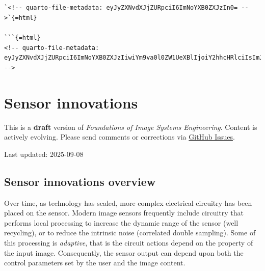 \documentclass[
  letterpaper,
]{book}
\begin{document}
\begin{verbatim}




`<!-- quarto-file-metadata: eyJyZXNvdXJjZURpciI6ImNoYXB0ZXJzIn0= -->`{=html}

```{=html}
<!-- quarto-file-metadata: eyJyZXNvdXJjZURpciI6ImNoYXB0ZXJzIiwiYm9va0l0ZW1UeXBlIjoiY2hhcHRlciIsImJvb2tJdGVtTnVtYmVyIjoyMCwiYm9va0l0ZW1GaWxlIjoiY2hhcHRlcnMvc2Vuc29ycy0wNy1pbm5vdmF0aW9ucy5xbWQiLCJib29rSXRlbURlcHRoIjoxfQ== -->
\end{verbatim}

\chapter{Sensor innovations}\label{sec-sensor-innovations}

\begin{tcolorbox}[enhanced jigsaw, colframe=quarto-callout-warning-color-frame, titlerule=0mm, rightrule=.15mm, opacitybacktitle=0.6, colback=white, leftrule=.75mm, coltitle=black, title=\textcolor{quarto-callout-warning-color}{\faExclamationTriangle}\hspace{0.5em}{Work in Progress}, bottomrule=.15mm, colbacktitle=quarto-callout-warning-color!10!white, breakable, left=2mm, bottomtitle=1mm, toptitle=1mm, opacityback=0, arc=.35mm, toprule=.15mm]

This is a \textbf{draft} version of \emph{Foundations of Image Systems
Engineering}. Content is actively evolving. Please send comments or
corrections via \href{https://github.com/wandell/FISE-git/issues}{GitHub
Issues}.

Last updated: 2025-09-08

\end{tcolorbox}

\section{Sensor innovations
overview}\label{sec-sensor-innovations-overview}

Over time, as technology has scaled, more complex electrical circuitry
has been placed on the sensor. Modern image sensors frequently include
circuitry that performs local processing to increase the dynamic range
of the sensor (well recycling), or to reduce the intrinsic noise
(correlated double sampling). Some of this processing is
\emph{adaptive}, that is the circuit actions depend on the property of
the input image. Consequently, the sensor output can depend upon both
the control parameters set by the user and the image content.
\end{document}
